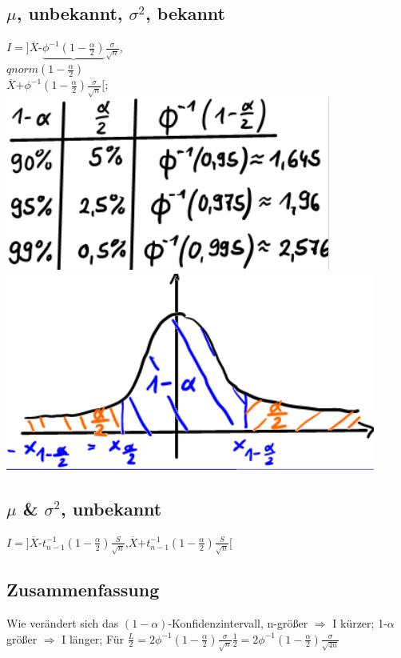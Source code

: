   \subsection{$ \mu $, unbekannt, $ \sigma^{2} $, bekannt}
  $ I = ] \overline{X} \textbf{-} \underbrace{\phi^{-1}( 1-\frac{\alpha}{2} ) } \frac{\sigma}{ \sqrt{n} }\textbf{,} $\\ 
  $ qnorm ( 1-\frac{\alpha}{2} ) $\\
  $ \overline{X} \textbf{+} \phi^{-1} ( 1- \frac{\alpha}{2} ) \frac{\sigma}{ \sqrt{n} } [ $; 
  \includegraphics[scale=0.25]{./pic/QnormTabelle.png}
  \includegraphics[scale=0.25]{./pic/KonfidenzintervallDichtefunktionTabelle.png}

  \subsection{$ \mu $ \& $ \sigma^{2} $, unbekannt }
  $ I = ] \overline{X} \textbf{-} t_{n-1}^{-1} ( 1-\frac{\alpha}{2} ) \frac{S}{ \sqrt{n} } \textbf{,} \overline{X}  \textbf{+} t_{n-1}^{-1} ( 1-\frac{\alpha}{2} )\frac{S}{ \sqrt{n} } [ $
  \subsection{Zusammenfassung}
  Wie verändert sich das $ (1 - \alpha ) $-Konfidenzintervall, n-größer $\Rightarrow$ I kürzer; 1-$ \alpha $ größer $ \Rightarrow $ I länger; 
  \newline
  \newline
  Für $ \frac{L}{2} = 2 \phi^{-1}( 1-\frac{ \alpha}{2} ) \frac{\sigma}{ \sqrt{n} } \frac{1}{2} = 2 \phi^{-1} ( 1- \frac{ \alpha }{2} ) \frac{\sigma}{ \sqrt{4n} } $
